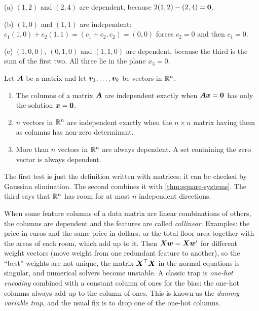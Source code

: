 \begin{example}\label{ex:independence}
(a) $(1, 2)$ and $(2, 4)$ are dependent, because $2(1, 2) - (2, 4) = \bm{0}$.

(b) $(1, 0)$ and $(1, 1)$ are independent: $c_1(1, 0) + c_2(1, 1) = (c_1 + c_2,
c_2) = (0, 0)$ forces $c_2 = 0$ and then $c_1 = 0$.

(c) $(1, 0, 0)$, $(0, 1, 0)$ and $(1, 1, 0)$ are dependent, because the third is
the sum of the first two. All three lie in the plane $x_3 = 0$.
\end{example}

\begin{theorem}\label{thm:independence-tests}
Let $\bm{A}$ be a matrix and let $\bm{v}_1, \dots, \bm{v}_k$ be vectors in $\mathbb{R}^n$.
\begin{enumerate}
  \item The columns of a matrix $\bm{A}$ are independent exactly when
    $\bm{A}\bm{x} = \bm{0}$ has only the solution $\bm{x} = \bm{0}$.
  \item $n$ vectors in $\mathbb{R}^n$ are independent exactly when the $n\times n$
    matrix having them as columns has non-zero determinant.
  \item More than $n$ vectors in $\mathbb{R}^n$ are always dependent. A set containing
    the zero vector is always dependent.
\end{enumerate}
\end{theorem}

The first test is just the definition written with matrices; it can be
checked by Gaussian elimination. The second combines it with
\cref{thm:square-systems}. The third says that $\mathbb{R}^n$ has room for at most $n$
independent directions.

\begin{mlnote}
When some feature columns of a data matrix are linear combinations of others,
the columns are dependent and the features are called \emph{collinear}.
Examples: the price in euros and the same price in dollars; or the total floor
area together with the areas of each room, which add up to it. Then
$\bm{X}\bm{w} = \bm{X}\bm{w}'$ for different weight vectors (move weight from one redundant
feature to another), so the ``best'' weights are not unique, the matrix
$\bm{X}^\top\bm{X}$ in the normal equations is singular, and numerical solvers become
unstable. A classic trap is \emph{one-hot encoding} combined with a constant
column of ones for the bias: the one-hot columns always add up to the column
of ones. This is known as the \emph{dummy-variable trap}, and the usual fix is
to drop one of the one-hot columns.
\end{mlnote}


